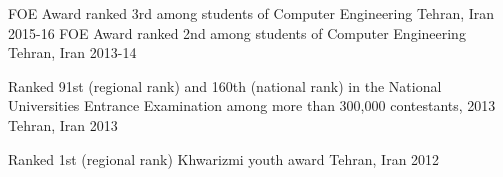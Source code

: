 
\begin{cvhonors}

  \cvhonor
    {FOE Award} %
    {ranked 3rd among students of Computer Engineering} %
    {Tehran, Iran} %
    {2015-16} %
  \cvhonor
    {FOE Award} %
    {ranked 2nd among students of Computer Engineering} %
    {Tehran, Iran} %
    {2013-14} %

  \cvhonor
    {Ranked 91st (regional rank)} %
    {and 160th (national rank) in the National Universities Entrance
Examination among more than 300,000 contestants, 2013} %
    {Tehran, Iran} %
    {2013} %
   
  \cvhonor
    {Ranked 1st (regional rank)} %
    {Khwarizmi youth award} %
    {Tehran, Iran} %
    {2012} %

\end{cvhonors}